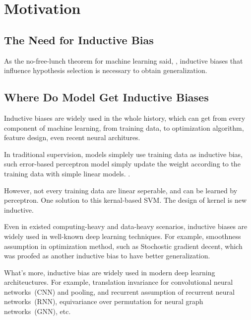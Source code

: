 \section{Motivation}
\label{sec:intro:motivation}


\subsection{The Need for Inductive Bias}
As the no-free-lunch theorem for machine learning said,
\cite{baxter2000model,wolpert1995no}, inductive biases that influence
hypothesis selection is necessary to obtain generalization.


\subsection{Where Do Model Get Inductive Biases}
Inductive biases are widely used in the whole history, which can get
from every component of machine learning, from training data, to
optimization algorithm, feature design, even recent neural architures.

 In traditional supervision, models
simplely use training data as inductive bias, such error-based
perceptron model simply update the weight according to the training
data with simple linear models. .

  However, not
every training data are linear seperable, and can be learned by
perceptron. One solution to this kernal-based SVM. The design of
kernel is new inductive.


 Even in existed computing-heavy and
data-heavy scenarios, inductive biases are widely used in well-known
deep learning techniques. For example, smoothness assumption in
optimization method, such as Stochostic gradient decent, which was
proofed as another inductive bias to have better
generalization. 


 What's more, inductive bias are
widely used in modern deep learning architeuctures.  For example,
translation invariance for convolutional neural networks~(CNN) and
pooling, and recurrent assumption of recurrent neural networks~(RNN),
equivariance over permutation for neural graph networks~(GNN), etc.

